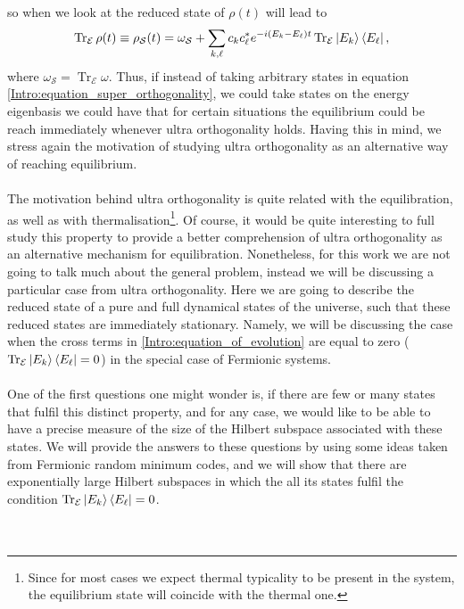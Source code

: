 so when we look at the reduced state of $\rho(t)$ will lead to
\begin{equation}
\operatorname{Tr}_{\mathcal{E}} \rho(t) \equiv \rho_{\mathcal{S}}(t) =\omega_{\mathcal{S}} + \sum_{ k,\ell}c_kc^*_\ell e^{-i(E_k-E_\ell)t}\operatorname{Tr}_{\mathcal{E}}\mathinner{|{E_k}\rangle}\mathinner{\langle{E_\ell}|},
\label{Intro:equation_of_evolution}
\end{equation}
where $\omega_{\mathcal{S}} = \operatorname{Tr}_{\mathcal{E}} \omega$. Thus, if instead of taking arbitrary states in equation \eqref{Intro:equation_super_orthogonality}, we could take states on the energy eigenbasis we could have that for certain situations the equilibrium could be reach immediately whenever ultra orthogonality holds. Having this in mind, we stress again the motivation of studying ultra orthogonality as an alternative way of reaching equilibrium.\\\\
\indent The motivation behind ultra orthogonality is quite related with the equilibration, as well as with thermalisation\footnote{ Since for most cases we expect thermal typicality to be present in the system, the equilibrium state will coincide with the thermal one.}. Of course, it would be quite interesting to full study this property to provide a better comprehension of ultra orthogonality as an alternative mechanism for equilibration. Nonetheless, for this work we are not going to talk much about the general problem, instead we will be discussing a particular case from ultra orthogonality. Here we are going to describe the reduced state of a pure and full dynamical states of the universe, such that these reduced states are immediately stationary. Namely, we will be discussing the case when the cross terms in \eqref{Intro:equation_of_evolution} are equal to zero ($\operatorname{Tr}_{\mathcal{E}}\mathinner{|{E_k}\rangle}\mathinner{\langle{E_\ell}|} = 0$) in the special case of Fermionic systems.\\\\
\indent One of the first questions one might wonder is, if there are few or many states that fulfil this distinct property, and for any case, we would like to be able to have a precise measure of the size of the Hilbert subspace associated with these states. We will provide the answers to these questions by using some ideas taken from Fermionic random minimum codes, and we will show that there are exponentially large Hilbert subspaces in which the all its states fulfil the condition $\operatorname{Tr}_{\mathcal{E}}\mathinner{|{E_k}\rangle}\mathinner{\langle{E_\ell}|} = 0$.\\\\\

